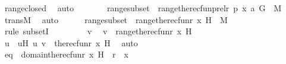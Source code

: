 \begin{isabellebody}
\ range{\isacharunderscore}{\kern0pt}closed\ \isamarkupfalse%
\ auto\isanewline
\ \ \ \ \isamarkupfalse%
\ \isamarkupfalse%
\ rangesubset{}\ {\isacharcolon}{\kern0pt}\ {\isachardoublequoteopen}range{\isacharparenleft}{\kern0pt}the{\isacharunderscore}{\kern0pt}recfun{\isacharparenleft}{\kern0pt}prel{\isacharparenleft}{\kern0pt}r{\isacharcomma}{\kern0pt}\ p{\isacharparenright}{\kern0pt}{\isacharcomma}{\kern0pt}\ {\isasymlangle}x{\isacharcomma}{\kern0pt}\ a{\isasymrangle}{\isacharcomma}{\kern0pt}\ G{\isacharparenright}{\kern0pt}{\isacharparenright}{\kern0pt}\ {\isasymsubseteq}\ M{\isachardoublequoteclose}\ \isamarkupfalse%
\ transM\ \isamarkupfalse%
\ auto\isanewline
\isanewline
\ \ \ \ \isamarkupfalse%
\ rangesubset\ {\isacharcolon}{\kern0pt}\ {\isachardoublequoteopen}range{\isacharparenleft}{\kern0pt}the{\isacharunderscore}{\kern0pt}recfun{\isacharparenleft}{\kern0pt}r{\isacharcomma}{\kern0pt}\ x{\isacharcomma}{\kern0pt}\ H{\isacharparenright}{\kern0pt}{\isacharparenright}{\kern0pt}\ {\isasymsubseteq}\ M{\isachardoublequoteclose}\ \isanewline
\ \ \ \ \isamarkupfalse%
\ {\isacharparenleft}{\kern0pt}rule\ subsetI{\isacharparenright}{\kern0pt}\ \isanewline
\ \ \ \ \ \ \isamarkupfalse%
\ v\ \isamarkupfalse%
\ {\isachardoublequoteopen}v\ {\isasymin}\ range{\isacharparenleft}{\kern0pt}the{\isacharunderscore}{\kern0pt}recfun{\isacharparenleft}{\kern0pt}r{\isacharcomma}{\kern0pt}\ x{\isacharcomma}{\kern0pt}\ H{\isacharparenright}{\kern0pt}{\isacharparenright}{\kern0pt}{\isachardoublequoteclose}\ \isanewline
\ \ \ \ \ \ \isamarkupfalse%
\ \isamarkupfalse%
\ u\ \ uH{\isacharcolon}{\kern0pt}\ {\isachardoublequoteopen}{\isacharless}{\kern0pt}u{\isacharcomma}{\kern0pt}\ v{\isachargreater}{\kern0pt}\ {\isasymin}\ the{\isacharunderscore}{\kern0pt}recfun{\isacharparenleft}{\kern0pt}r{\isacharcomma}{\kern0pt}\ x{\isacharcomma}{\kern0pt}\ H{\isacharparenright}{\kern0pt}{\isachardoublequoteclose}\ \isamarkupfalse%
\ auto\ \isanewline
\isanewline
\ \ \ \ \ \ \isamarkupfalse%
\ eq\ {\isacharcolon}{\kern0pt}\ {\isachardoublequoteopen}domain{\isacharparenleft}{\kern0pt}the{\isacharunderscore}{\kern0pt}recfun{\isacharparenleft}{\kern0pt}r{\isacharcomma}{\kern0pt}\ x{\isacharcomma}{\kern0pt}\ H{\isacharparenright}{\kern0pt}{\isacharparenright}{\kern0pt}\ {\isacharequal}{\kern0pt}\ r\ {\isacharminus}{\kern0pt}{\isacharbackquote}{\kern0pt}{\isacharbackquote}{\kern0pt}\ {\isacharbraceleft}{\kern0pt}x{\isacharbraceright}{\kern0pt}{\isachardoublequoteclose}\ \isanewline

\end{isabellebody}
